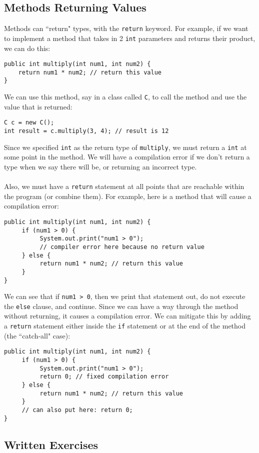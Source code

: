 \subsection{Methods Returning Values}
Methods can ``return" types, with the \verb|return| keyword. For example, if we want to implement a method that takes in 2 \verb|int| parameters and returns their product, we can do this:
\begin{lstlisting}
public int multiply(int num1, int num2) {
	return num1 * num2; // return this value
}
\end{lstlisting}
We can use this method, say in a class called \verb|C|, to call the method and use the value that is returned:
\begin{lstlisting}
C c = new C();
int result = c.multiply(3, 4); // result is 12
\end{lstlisting}
Since we specified \verb|int| as the return type of \verb|multiply|, we must return a \verb|int| at some point in the method. We will have a compilation error if we don't return a type when we say there will be, or returning an incorrect type.
\\ \\
Also, we must have a \verb|return| statement at all points that are reachable within the program (or combine them). For example, here is a method that will cause a compilation error:
\begin{lstlisting}
public int multiply(int num1, int num2) {
     if (num1 > 0) {
          System.out.print("num1 > 0");
          // compiler error here because no return value
     } else {
          return num1 * num2; // return this value
     }
}
\end{lstlisting}
We can see that if \verb|num1 > 0|, then we print that statement out, do not execute the \verb|else| clause, and continue. Since we can have a way through the method without returning, it causes a compilation error. We can mitigate this by adding a \verb|return| statement either inside the \verb|if| statement or at the end of the method (the ``catch-all" case):
\begin{lstlisting}
public int multiply(int num1, int num2) {
     if (num1 > 0) {
          System.out.print("num1 > 0");
          return 0; // fixed compilation error
     } else {
          return num1 * num2; // return this value
     }
     // can also put here: return 0;
}
\end{lstlisting}

\subsection{Written Exercises}

